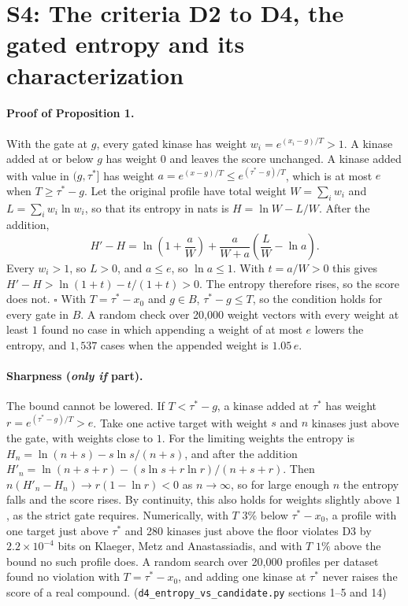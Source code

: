 \documentclass[11pt]{article}
\begin{document}
\clearpage
\section*{S4: The criteria D2 to D4, the gated entropy and its characterization}

\paragraph{Proof of Proposition 1.} With the gate at $g$, every gated kinase has
weight $w_i = e^{(x_i - g)/T} > 1$. A kinase added at or below $g$ has weight
$0$ and leaves the score unchanged. A kinase added with value in $(g, \tau^*]$
has weight $a = e^{(x - g)/T} \leq e^{(\tau^* - g)/T}$, which is at most $e$ when
$T \geq \tau^* - g$. Let the original profile have total weight
$W = \sum_i w_i$ and $L = \sum_i w_i \ln w_i$, so that its entropy in nats is
$H = \ln W - L/W$. After the addition,
\[
  H' - H = \ln\!\left(1 + \frac{a}{W}\right) + \frac{a}{W + a}\left(\frac{L}{W} - \ln a\right).
\]
Every $w_i > 1$, so $L > 0$, and $a \leq e$, so $\ln a \leq 1$. With
$t = a/W > 0$ this gives $H' - H > \ln(1 + t) - t/(1 + t) > 0$. The entropy
therefore rises, so the score does not. $\square$ With $T = \tau^* - x_0$ and
$g \in B$, $\tau^* - g \leq T$, so the condition holds for every gate in $B$.
A random check over 20{,}000 weight vectors with every weight at least $1$
found no case in which appending a weight of at most $e$ lowers the entropy,
and $1{,}537$ cases when the appended weight is $1.05\,e$.

\paragraph{Sharpness (\emph{only if} part).} The bound cannot be lowered. If $T < \tau^* - g$, a
kinase added at $\tau^*$ has weight $r = e^{(\tau^* - g)/T} > e$. Take one active target with weight
$s$ and $n$ kinases just above the gate, with weights close to $1$. For the
limiting weights the entropy is $H_n = \ln(n + s) - s\ln s/(n + s)$, and after
the addition $H'_n = \ln(n + s + r) - (s\ln s + r\ln r)/(n + s + r)$. Then
$n(H'_n - H_n) \to r(1 - \ln r) < 0$ as $n \to \infty$, so for large enough $n$
the entropy falls and the score rises. By continuity, this also holds for
weights slightly above $1$, as the strict gate requires. Numerically, with $T$ $3\%$ below
$\tau^* - x_0$, a profile with one target just above $\tau^*$ and 280 kinases
just above the floor violates D3 by $2.2 \times 10^{-4}$ bits on Klaeger, Metz
and Anastassiadis, and with $T$ $1\%$ above the bound no such profile does. A
random search over 20{,}000 profiles per dataset found no violation with
$T = \tau^* - x_0$, and adding one kinase at $\tau^*$ never raises the score of
a real compound.
(\texttt{d4\_\allowbreak{}entropy\_\allowbreak{}vs\_\allowbreak{}candidate.py}
sections 1--5 and 14)
\end{document}
